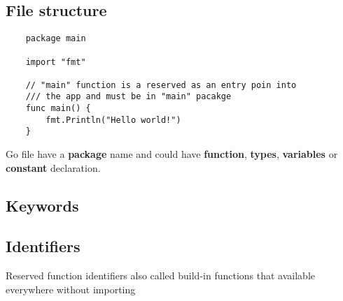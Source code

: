 \documentclass[12pt]{article}
\begin{document}
\begin{multicols}{2}
    \subsection{File structure}
    \begin{lstlisting}
    package main

    import "fmt"

    // "main" function is a reserved as an entry poin into
    /// the app and must be in "main" pacakge
    func main() {
        fmt.Println("Hello world!")
    }
    \end{lstlisting}

    Go file have a \textbf{package} name and could have \textbf{function},
    \textbf{types}, \textbf{variables} or \textbf{constant} declaration.

    \subsection{Keywords}
    \subsection{Identifiers}
    Reserved function identifiers also called build-in functions that
    available everywhere without importing



\end{multicols}
\end{document}
